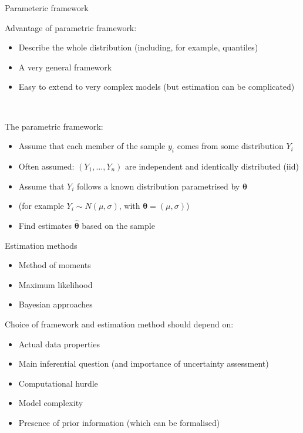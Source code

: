\documentclass[
  10pt,
  ignorenonframetext,
  compress]{beamer}
\providecommand{\tightlist}{%
  \setlength{\itemsep}{0pt}\setlength{\parskip}{0pt}}
\begin{document}
\begin{frame}{Parameteric framework}
\protect\hypertarget{parameteric-framework}{}

Advantage of parametric framework:

\begin{itemize}
\tightlist
\item
  Describe the whole distribution (including, for example, quantiles)
\item
  A very general framework
\item
  Easy to extend to very complex models (but estimation can be
  complicated)
\end{itemize}

~

\pause

The parametric framework:

\begin{itemize}
\tightlist
\item
  Assume that each member of the sample \(y_i\) comes from some
  distribution \(Y_i\)
\item
  Often assumed: \((Y_1, \ldots, Y_n)\) are independent and identically
  distributed (iid)
\item
  Assume that \(Y_i\) follows a known distribution parametrised by
  \(\boldsymbol{\theta}\)
\item
  (for example \(Y_i \sim N(\mu, \sigma)\), with
  \(\boldsymbol{\theta} = (\mu, \sigma)\))
\item
  Find estimates \(\hat{\boldsymbol{\theta}}\) based on the sample
\end{itemize}

\end{frame}

\begin{frame}{Estimation methods}
\protect\hypertarget{estimation-methods}{}

\begin{itemize}
\tightlist
\item
  Method of moments
\item
  Maximum likelihood
\item
  Bayesian approaches
\end{itemize}

\pause

Choice of framework and estimation method should depend on:

\begin{itemize}
\tightlist
\item
  Actual data properties
\item
  Main inferential question (and importance of uncertainty assessment)
\item
  Computational hurdle
\item
  Model complexity
\item
  Presence of prior information (which can be formalised)
\end{itemize}

\end{frame}
\end{document}

